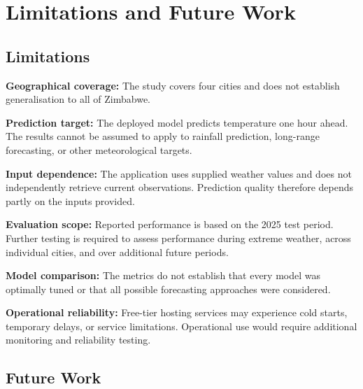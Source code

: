 \documentclass[12pt,a4paper]{article}
\begin{document}
	\section{Limitations and Future Work}
	
	\subsection{Limitations}
	
	\textbf{Geographical coverage:} The study covers four cities and
	does not establish generalisation to all of Zimbabwe.
	
	\textbf{Prediction target:} The deployed model predicts temperature
	one hour ahead. The results cannot be assumed to apply to rainfall
	prediction, long-range forecasting, or other meteorological targets.
	
	\textbf{Input dependence:} The application uses supplied weather
	values and does not independently retrieve current observations.
	Prediction quality therefore depends partly on the inputs provided.
	
	\textbf{Evaluation scope:} Reported performance is based on the 2025
	test period. Further testing is required to assess performance during
	extreme weather, across individual cities, and over additional
	future periods.
	
	\textbf{Model comparison:} The metrics do not establish that every
	model was optimally tuned or that all possible forecasting
	approaches were considered.
	
	\textbf{Operational reliability:} Free-tier hosting services may
	experience cold starts, temporary delays, or service limitations.
	Operational use would require additional monitoring and reliability
	testing.
	
	\subsection{Future Work}
	
\end{document}
